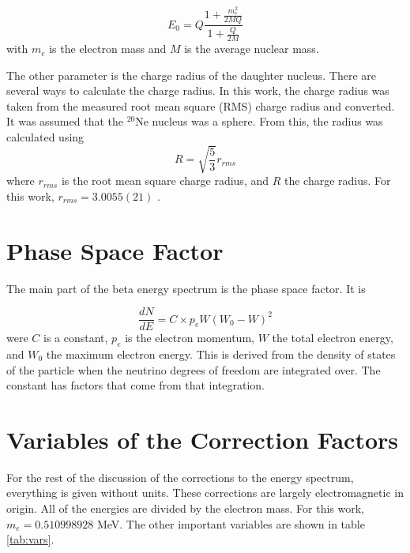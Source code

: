 \documentclass[../MaxHughesThesis.tex]{subfiles}
\begin{document}
\begin{equation}
	E_{0} = Q\frac{1 + \frac{m_{e}^{2}}{2MQ}}{1 + \frac{Q}{2M}} 
	\label{eq:recoilqval}
\end{equation} 
with $m_{e}$ is the electron mass and $M$ is the average nuclear mass. 

The other parameter is the charge radius of the daughter nucleus.
There are several ways to calculate the charge radius.
In this work, the charge radius was taken from the measured root mean square (RMS) charge radius and converted.
It was assumed that the $^{20}$Ne nucleus was a sphere. 
From this, the radius was calculated using %
\begin{equation}
	R = \sqrt{\frac{5}{3}}r_{rms}	
	\label{eq:sphereeq}
\end{equation}
where $r_{rms}$ is the root mean square charge radius, and $R$ the charge radius.
For this work, $r_{rms} = 3.0055 (21)$ \cite{Ang13}.

\section{Phase Space Factor}
The main part of the beta energy spectrum is the phase space factor.
It is %

\begin{equation}
	\frac{dN}{dE} = C \times p_{e}W(W_{0} - W)^{2}
	\label{eq:phase_space}
\end{equation}
were $C$ is a constant, $p_{e}$ is the electron momentum, $W$ the total electron energy, and $W_{0}$ the maximum electron energy.
This is derived from the density of states of the particle when the neutrino degrees of freedom are integrated over.
The constant has factors that come from that integration.

\section{Variables of the Correction Factors}

For the rest of the discussion of the corrections to the energy spectrum, everything is given without units.
These corrections are largely electromagnetic in origin.
All of the energies are divided by the electron mass.
For this work, $m_{e} = 0.510998928$ MeV.
The other important variables are shown in table \ref{tab:vars}.
\end{document}
